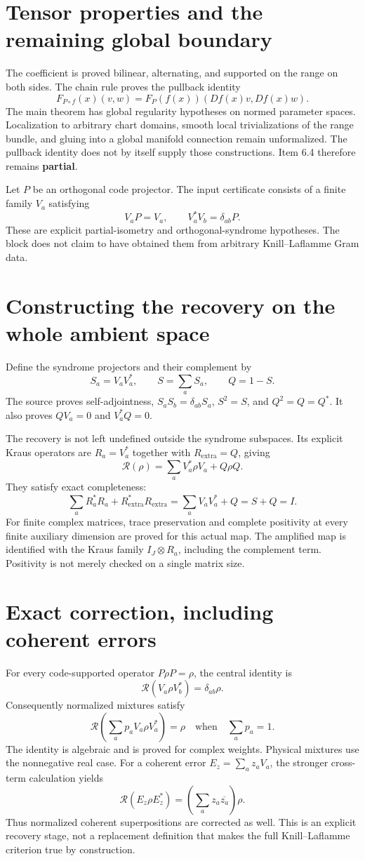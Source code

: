 \documentclass[10pt,letterpaper]{article}
\newcommand{\pageheading}[2]{\vspace*{2pt}{\small\color{ink}\textsc{#1}}\par\vspace{2pt}{\Large\bfseries #2}\par\vspace{4pt}}
\begin{document}
\section*{Tensor properties and the remaining global boundary}
The coefficient is proved bilinear, alternating, and supported on the range on both sides. The chain rule proves the pullback identity
\[
F_{P\circ f}(x)(v,w)=F_P(f(x))(Df(x)v,Df(x)w).
\]
The main theorem has global regularity hypotheses on normed parameter spaces. Localization to arbitrary chart domains, smooth local trivializations of the range bundle, and gluing into a global manifold connection remain unformalized. The pullback identity does not by itself supply those constructions. Item 6.4 therefore remains \textbf{partial}.

\newpage
\pageheading{Item 8.1 advanced}{A constructive and total syndrome recovery}
Let $P$ be an orthogonal code projector. The input certificate consists of a finite family $V_a$ satisfying
\[
V_aP=V_a,
\qquad
V_a^*V_b=\delta_{ab}P.
\]
These are explicit partial-isometry and orthogonal-syndrome hypotheses. The block does not claim to have obtained them from arbitrary Knill--Laflamme Gram data.

\section*{Constructing the recovery on the whole ambient space}
Define the syndrome projectors and their complement by
\[
S_a=V_aV_a^*,\qquad S=\sum_aS_a,\qquad Q=1-S.
\]
The source proves self-adjointness, $S_aS_b=\delta_{ab}S_a$, $S^2=S$, and $Q^2=Q=Q^*$. It also proves $QV_a=0$ and $V_a^*Q=0$.

The recovery is not left undefined outside the syndrome subspaces. Its explicit Kraus operators are $R_a=V_a^*$ together with $R_{\mathrm{extra}}=Q$, giving
\[
\mathcal R(\rho)=\sum_aV_a^*\rho V_a+Q\rho Q.
\]
They satisfy exact completeness:
\[
\sum_aR_a^*R_a+R_{\mathrm{extra}}^*R_{\mathrm{extra}}
=\sum_aV_aV_a^*+Q=S+Q=I.
\]
For finite complex matrices, trace preservation and complete positivity at every finite auxiliary dimension are proved for this actual map. The amplified map is identified with the Kraus family $I_J\otimes R_a$, including the complement term. Positivity is not merely checked on a single matrix size.

\section*{Exact correction, including coherent errors}
For every code-supported operator $P\rho P=\rho$, the central identity is
\[
\boxed{\mathcal R(V_a\rho V_b^*)=\delta_{ab}\rho.}
\]
Consequently normalized mixtures satisfy
\[
\mathcal R\!\left(\sum_ap_aV_a\rho V_a^*\right)=\rho
\quad\text{when}\quad\sum_ap_a=1.
\]
The identity is algebraic and is proved for complex weights. Physical mixtures use the nonnegative real case. For a coherent error $E_z=\sum_a z_aV_a$, the stronger cross-term calculation yields
\[
\mathcal R(E_z\rho E_z^*)=\left(\sum_a z_a\overline{z_a}\right)\rho.
\]
Thus normalized coherent superpositions are corrected as well. This is an explicit recovery stage, not a replacement definition that makes the full Knill--Laflamme criterion true by construction.
\end{document}
